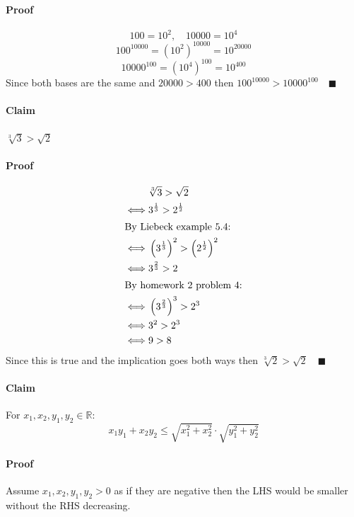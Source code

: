 \documentclass{article}
\newcommand{\bb}[1]{\mathbb{#1}}
\newcounter{example}[section]
\begin{document}
\paragraph{Proof} \[100=10^2,\quad10000=10^4\]
\[100^{10000}=(10^2)^{10000}=10^{20000}\]
\[10000^{100}=(10^4)^{100}=10^{400}\]
Since both bases are the same and \(20000>400\) then \(100^{10000}>10000^{100}\quad\blacksquare\)

\paragraph{Claim} \(\sqrt[3]{3}>\sqrt 2\)

\paragraph{Proof}
\begin{align*}
&\sqrt[3]{3}>\sqrt 2\\
\iff&3^{\frac 13}>2^{\frac 12}\\
\intertext{By Liebeck example 5.4:}
\iff&\left(3^{\frac 13}\right)^2>\left(2^{\frac 12}\right)^2\\
\iff&3^{\frac 23}>2\\
\intertext{By homework 2 problem 4:}
\iff&\left(3^{\frac 23}\right)^3>2^3\\
\iff&3^2>2^3\\
\iff&9>8
\end{align*}
Since this is true and the implication goes both ways then \(\sqrt[3]2>\sqrt 2\quad\blacksquare\)

\paragraph{Claim} For \(x_1,x_2,y_1,y_2\in\bb R\):
\[x_1y_1+x_2y_2\le\sqrt{x_1^2+x_2^2}\cdot\sqrt{y_1^2+y_2^2}\]

\paragraph{Proof} Assume \(x_1,x_2,y_1,y_2>0\) as if they are negative then the LHS would be smaller without the RHS decreasing.
\end{document}
